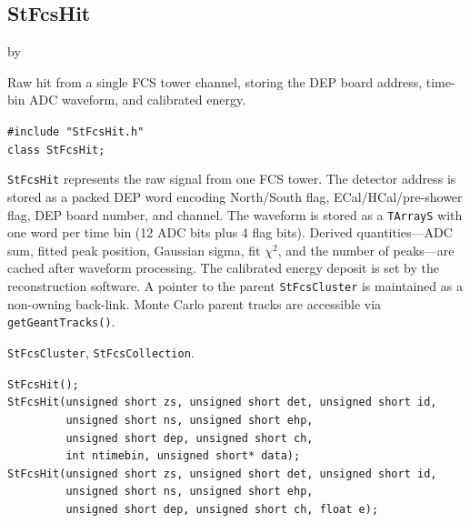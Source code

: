 \documentclass[twoside]{article}
\newcommand{\entrylabel}[1]{\mbox{\textbf{{#1}}}\hfil}%
\newenvironment{entry}
{\begin{list}{}%
    {\renewcommand{\makelabel}{\entrylabel}%
     \setlength{\labelwidth}{90pt}%
     \setlength{\leftmargin}{\labelwidth}
     \advance\leftmargin by \labelsep%
      }%
    }%
  {\end{list}}
\newcommand{\Entrylabel}[1]%
{\raisebox{0pt}[1ex][0pt]{\makebox[\labelwidth][l]%
    {\parbox[t]{\labelwidth}{\hspace{0pt}\textbf{{#1}}}}}}
\newenvironment{Entry}%
{\renewcommand{\entrylabel}{\Entrylabel}\begin{entry}}%
  {\end{entry}}
\begin{document}
\subsection{StFcsHit}
\label{sec:StFcsHit}
\begin{Entry}
\item[Summary]
    Raw hit from a single FCS tower channel, storing the DEP board address,
    time-bin ADC waveform, and calibrated energy.

\item[Synopsis]
    \verb+#include "StFcsHit.h"+\\
    \verb+class StFcsHit;+\\

\item[Description]
    \texttt{StFcsHit} represents the raw signal from one FCS tower.  The
    detector address is stored as a packed DEP word encoding North/South flag,
    ECal/HCal/pre-shower flag, DEP board number, and channel.  The waveform
    is stored as a \texttt{TArrayS} with one word per time bin (12 ADC bits
    plus 4 flag bits).  Derived quantities---ADC sum, fitted peak position,
    Gaussian sigma, fit $\chi^{2}$, and the number of peaks---are cached after
    waveform processing.  The calibrated energy deposit is set by the
    reconstruction software.  A pointer to the parent \texttt{StFcsCluster}
    is maintained as a non-owning back-link.  Monte Carlo parent tracks
    are accessible via \texttt{getGeantTracks()}.

\item[Related Classes]
    \texttt{StFcsCluster}, \texttt{StFcsCollection}.

\item[Public\\ Constructors]
    \verb+StFcsHit();+\\
    \verb+StFcsHit(unsigned short zs, unsigned short det, unsigned short id,+\\
    \verb+         unsigned short ns, unsigned short ehp,+\\
    \verb+         unsigned short dep, unsigned short ch,+\\
    \verb+         int ntimebin, unsigned short* data);+\\
    \verb+StFcsHit(unsigned short zs, unsigned short det, unsigned short id,+\\
    \verb+         unsigned short ns, unsigned short ehp,+\\
    \verb+         unsigned short dep, unsigned short ch, float e);+\\


\end{Entry}
\end{document}
